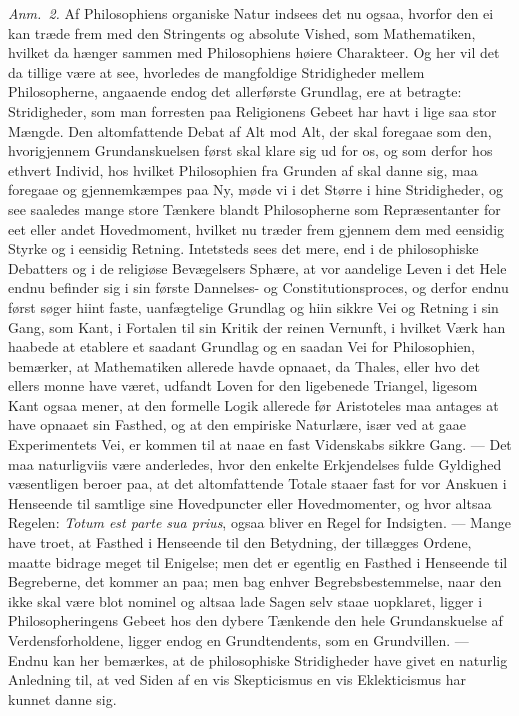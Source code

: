 \documentclass[12pt,a4paper]{book}
\begin{document}
{\small\emph{Anm.~2.} Af Philosophiens organiske Natur indsees det nu ogsaa, hvorfor
den ei kan træde frem med den Stringents og absolute Vished, som Mathematiken,
hvilket da hænger sammen med Philosophiens høiere Charakteer. Og her vil det da
tillige være at see, hvorledes de mangfoldige Stridigheder mellem Philosopherne,
angaaende endog det allerførste Grundlag, ere at betragte: Stridigheder, som man
forresten paa Religionens Gebeet har havt i lige saa stor Mængde. Den altomfattende
Debat af Alt mod Alt, der skal foregaae som den, hvorigjennem Grundanskuelsen først
skal klare sig ud for os, og som derfor hos ethvert Individ, hos hvilket
Philosophien fra Grunden af skal danne sig, maa foregaae og gjennemkæmpes paa Ny,
møde vi i det Større i hine Stridigheder, og see saaledes mange store Tænkere blandt
Philosopherne som Repræsentanter for eet eller andet Hovedmoment, hvilket nu træder
frem gjennem dem med eensidig Styrke og i eensidig Retning. Intetsteds sees det mere,
end i de philosophiske Debatters og i de religiøse Bevægelsers Sphære, at vor
aandelige Leven i det Hele endnu befinder sig i sin første Dannelses- og
Constitutionsproces, og derfor endnu først søger hiint faste, uanfægtelige Grundlag
og hiin sikkre Vei og Retning i sin Gang, som Kant, i Fortalen til sin Kritik der
reinen Vernunft, i hvilket Værk han haabede at etablere et saadant Grundlag og en
saadan Vei for Philosophien, bemærker, at Mathematiken allerede havde opnaaet, da
Thales, eller hvo det ellers monne have været, udfandt Loven for den ligebenede
Triangel, ligesom Kant ogsaa mener, at den formelle Logik allerede før Aristoteles
maa antages at have opnaaet sin Fasthed, og at den empiriske Naturlære, især ved at
gaae Experimentets Vei, er kommen til at naae en fast Videnskabs sikkre Gang. --- Det
maa naturligviis være anderledes, hvor den enkelte Erkjendelses fulde Gyldighed
væsentligen beroer paa, at det altomfattende Totale staaer fast for vor Anskuen i
Henseende til samtlige sine Hovedpuncter eller Hovedmomenter, og hvor altsaa Regelen:
\textit{Totum est parte sua prius}, ogsaa bliver en Regel for Indsigten. --- Mange
have troet, at Fasthed i Henseende til den Betydning, der tillægges Ordene, maatte
bidrage meget til Enigelse; men det er egentlig en Fasthed i Henseende til
Begreberne, det kommer an paa; men bag enhver Begrebsbestemmelse, naar den ikke skal
være blot nominel og altsaa lade Sagen selv staae uopklaret, ligger i
Philosopheringens Gebeet hos den dybere Tænkende den hele Grundanskuelse af
Verdensforholdene, ligger endog en Grundtendents, som en Grundvillen. --- Endnu kan
her bemærkes, at de philosophiske Stridigheder have givet en naturlig Anledning til,
at ved Siden af en vis Skepticismus en vis Eklekticismus har kunnet danne sig.\par}
\end{document}
